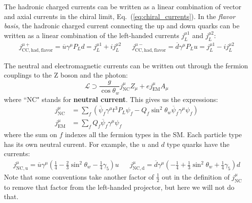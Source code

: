 \documentclass[11pt, oneside]{article}   	%
\theoremstyle{definition}
\numberwithin{equation}{subsection}		%
\begin{document}
The hadronic charged currents can be written as a linear combination of vector and axial currents in the chiral limit, 
Eq.~(\ref{eq:chiral_currents}). In the \textit{flavor basis}, the hadronic charged current connecting the up and down quarks can be written 
as a linear combination of the left-handed currents $j_L^{\mu 1}$ and $j_L^{\mu 2}$:
\begin{align}
	j_\mathrm{CC, had, flavor}^{\mu +} = \overline u \gamma^\mu P_L d = j_L^{\mu 1} + i j_L^{\mu 2} &&
	j_\mathrm{CC, had, flavor}^{\mu -} = \overline d \gamma^\mu P_L u = j_L^{\mu 1} - i j_L^{\mu 2} 
\end{align}

The neutral and electromagnetic currents can be written out through the fermion couplings to the Z boson and the photon:
\begin{equation}
	\mathcal L\supset \frac{g}{\cos\theta_w} j_\mathrm{NC}^{\mu} Z_\mu + e j_\mathrm{EM}^\mu A_\mu
\end{equation}
where ``NC" stands for \textbf{neutral current}. This gives us the expressions:
\begin{align}
	j_\mathrm{NC}^\mu &= \sum_f \left( \overline\psi_f \gamma^\mu t^3 P_L\psi_f - Q_f\sin^2\theta_w \overline\psi_f\gamma^\mu\psi_f 
	\right) \\
	j_\mathrm{EM}^\mu &= \sum_f Q_f \overline \psi_f \gamma^\mu\psi_f
\end{align}
where the sum on $f$ indexes all the fermion types in the SM. Each particle type has its own neutral current. For example, the $u$ and $d$ 
type quarks have the currents:
\begin{align}
	j_\mathrm{NC, u}^\mu = \overline u \gamma^\mu \left(\frac{1}{4} - \frac{2}{3}\sin^2\theta_w - \frac{1}{4}\gamma_5 
	\right) u && 
	j_\mathrm{NC, d}^\mu = \overline d \gamma^\mu \left(-\frac{1}{4} + \frac{1}{3}\sin^2\theta_w + \frac{1}{4} 
	\gamma_5 \right) d
\end{align}
Note that some conventions take another factor of $\frac{1}{2}$ out in the definition of $j_\mathrm{NC}^\mu$ to remove that factor 
from the left-handed projector, but here we will not do that.
\end{document}
